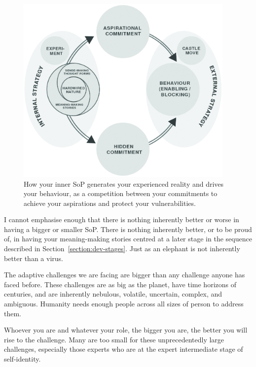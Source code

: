 \begin{figure}[htb]
\centering
    \includegraphics[width=0.95\textwidth]{./Images/Ground-pattern}
    \caption[How your sense-, meaning-making, and your nature drives your behaviours.]{How your inner SoP generates your experienced reality and drives your behaviour, as a competition between your commitments to achieve your aspirations and protect your vulnerabilities.}
    \label{fig:ground-pattern}
\end{figure}




I cannot emphasise enough that there is nothing inherently better or worse in having a bigger or smaller SoP. There is nothing inherently better, or to be proud of, in having your meaning\hyp{}making stories centred at a later stage in the sequence described in Section~\ref{section:dev-stages}. Just as an elephant is not inherently better than a virus.


The adaptive challenges we are facing are bigger than any challenge anyone has faced before. These challenges are as big as the planet, have time horizons of centuries, and are inherently nebulous, volatile, uncertain, complex, and ambiguous. Humanity needs enough people across all sizes of person to address them. 


Whoever you are and whatever your role, the bigger you are, the better you will rise to the challenge. Many are too small for these unprecedentedly large challenges, especially those experts who are at the expert intermediate stage of self-identity. 


